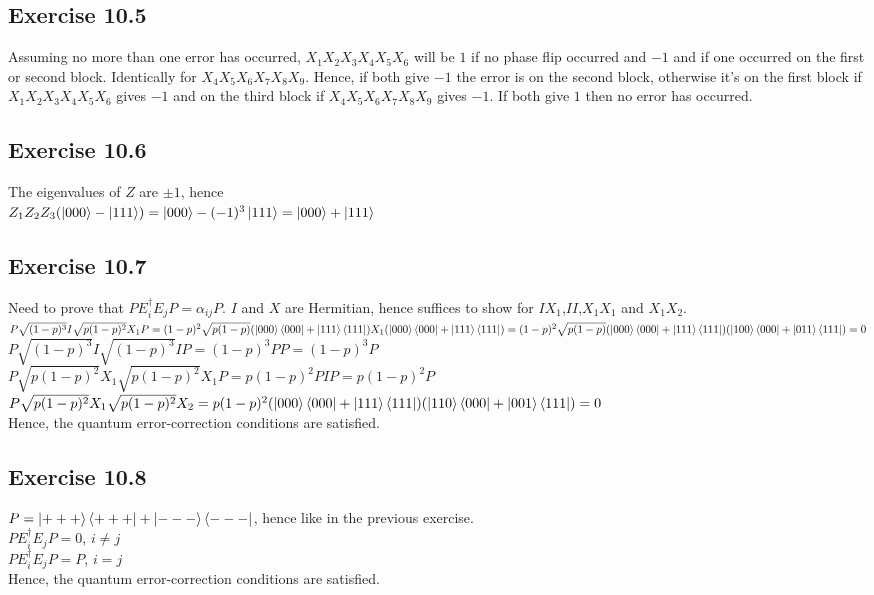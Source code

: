\documentclass[a4paper,12pt]{article}
\begin{document}
\subsection*{Exercise 10.5}
Assuming no more than one error has occurred, $X_1X_2X_3X_4X_5X_6$ will be $1$ if no phase flip occurred
and $-1$ and if one occurred on the first or second block. Identically for $X_4X_5X_6X_7X_8X_9$.
Hence, if both give $-1$ the error is on the second block, otherwise it's on the first block if
$X_1X_2X_3X_4X_5X_6$ gives $-1$ and on the third block if $X_4X_5X_6X_7X_8X_9$ gives $-1$.
If both give $1$ then no error has occurred.
\subsection*{Exercise 10.6}
The eigenvalues of $Z$ are $\pm 1$, hence\\
$Z_1Z_2Z_3(\ket{000}-\ket{111})=\ket{000}-(-1)^3\ket{111}=\ket{000}+\ket{111}$
\subsection*{Exercise 10.7}
Need to prove that $PE_i^\dagger E_jP=\alpha_{ij}P$. $I$ and $X$ are Hermitian, hence suffices
to show for $IX_1$,$II$,$X_1X_1$ and $X_1X_2$.\\
$P\sqrt{(1-p)^3}I\sqrt{p(1-p)^2}X_1P=(1-p)^2\sqrt{p(1-p)}
(\ket{000}\bra{000}+\ket{111}\bra{111})X_1(\ket{000}\bra{000}+\ket{111}\bra{111})=
(1-p)^2\sqrt{p(1-p)}
(\ket{000}\bra{000}+\ket{111}\bra{111})(\ket{100}\bra{000}+\ket{011}\bra{111})=0$\\
$P\sqrt{(1-p)^3}I\sqrt{(1-p)^3}IP=(1-p)^3PP=(1-p)^3P$\\
$P\sqrt{p(1-p)^2}X_1\sqrt{p(1-p)^2}X_1P=p(1-p)^2PIP=p(1-p)^2P$\\
$P\sqrt{p(1-p)^2}X_1\sqrt{p(1-p)^2}X_2=p(1-p)^2
(\ket{000}\bra{000}+\ket{111}\bra{111})(\ket{110}\bra{000}+\ket{001}\bra{111})=0$\\
Hence, the quantum error-correction conditions are satisfied.
\subsection*{Exercise 10.8}
$P=\ket{+++}\bra{+++}+\ket{---}\bra{---}$, hence like in the previous exercise.\\
$PE_i^\dagger E_jP=0$, $i\neq j$\\
$PE_i^\dagger E_jP=P$, $i=j$\\
Hence, the quantum error-correction conditions are satisfied.
\end{document}
